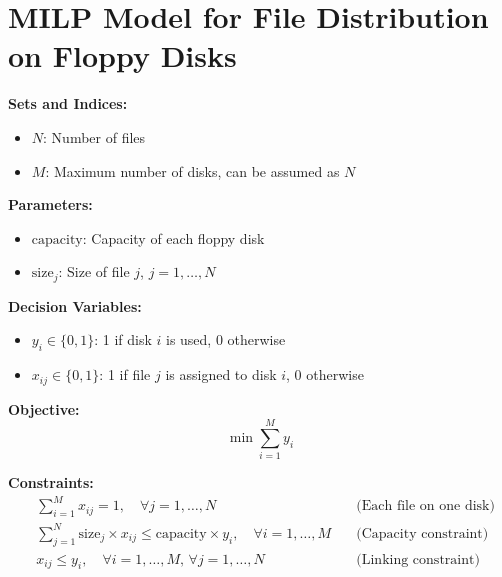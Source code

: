 \documentclass{article}
\begin{document}
\section*{MILP Model for File Distribution on Floppy Disks}

\textbf{Sets and Indices:}
\begin{itemize}
    \item \( N \): Number of files
    \item \( M \): Maximum number of disks, can be assumed as \( N \)
\end{itemize}

\textbf{Parameters:}
\begin{itemize}
    \item \(\text{capacity}\): Capacity of each floppy disk
    \item \(\text{size}_j\): Size of file \( j \), \( j = 1, \ldots, N \)
\end{itemize}

\textbf{Decision Variables:}
\begin{itemize}
    \item \( y_i \in \{0,1\} \): 1 if disk \( i \) is used, 0 otherwise
    \item \( x_{ij} \in \{0,1\} \): 1 if file \( j \) is assigned to disk \( i \), 0 otherwise
\end{itemize}

\textbf{Objective:}
\[
\min \sum_{i=1}^{M} y_i
\]

\textbf{Constraints:}
\begin{align}
    & \sum_{i=1}^{M} x_{ij} = 1, \quad \forall j = 1, \ldots, N \quad &\text{(Each file on one disk)} \\
    & \sum_{j=1}^{N} \text{size}_j \times x_{ij} \leq \text{capacity} \times y_i, \quad \forall i = 1, \ldots, M \quad &\text{(Capacity constraint)} \\
    & x_{ij} \leq y_i, \quad \forall i = 1, \ldots, M, \, \forall j = 1, \ldots, N \quad &\text{(Linking constraint)}
\end{align}
\end{document}
